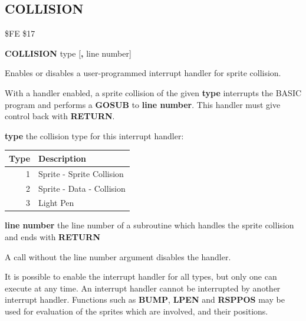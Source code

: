 \subsection{COLLISION}
\begin{description}[leftmargin=2cm,style=nextline]
\item [Token:] \$FE \$17
\item [Format:] {\bf COLLISION} type [{\bf,} line number]
\item [Usage:]  Enables or disables a user-programmed interrupt handler for sprite collision.

                With a handler enabled, a sprite collision of the given {\bf type}
                interrupts the BASIC program and performs a {\bf GOSUB}
                to {\bf line number}.
                This handler must give control back with {\bf RETURN}.

                {\bf type} the collision type for
                this interrupt handler:
                    \begin{center}
                    \begin{tabular}{|r|l|}
                    \hline
                    {\bf Type} & {\bf Description}\\
                    \hline
                    1	& 	Sprite - Sprite Collision \\
                    2	& 	Sprite - Data - Collision \\
                    3	& 	Light Pen \\
                    \hline
                    \end{tabular}
                    \end{center}

                {\bf line number} the line number of a subroutine
                which handles the sprite collision
                and ends with {\bf RETURN}

                A call without the line number argument disables the handler.

\item [Remarks:] It is possible to enable the interrupt handler for
               all types, but only one can execute at any time.
               An interrupt handler cannot be interrupted by another
               interrupt handler.
               Functions such as {\bf BUMP}, {\bf LPEN} and
               {\bf RSPPOS} may be used for evaluation of the sprites
               which are involved, and their positions.


\end{description}
